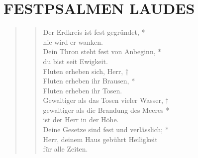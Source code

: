 





\section[]{FESTPSALMEN LAUDES}

\begin{quote}
\begin{verse}


\smallskip
\vin Der Erdkreis ist fest gegründet, *\\  \vin nie wird er wanken.\\ 
Dein Thron steht fest von Anbeginn, *\\
du bist seit Ewigkeit.\\ \vin
Fluten erheben sich, Herr, †\\ \vin
Fluten erheben ihr Brausen, * \\ \vin Fluten erheben ihr Tosen.\\ 
Gewaltiger als das Tosen vieler Wasser, †\\
gewaltiger als die Brandung des Meeres *\\ ist der Herr in der Höhe.\\
\vin Deine Gesetze sind fest und verlässlich; *\\
\vin Herr, deinem Haus gebührt Heiligkeit\\ \vin für alle Zeiten.\\ 
\end{verse}



\end{quote}

\vspace{0.5cm}


